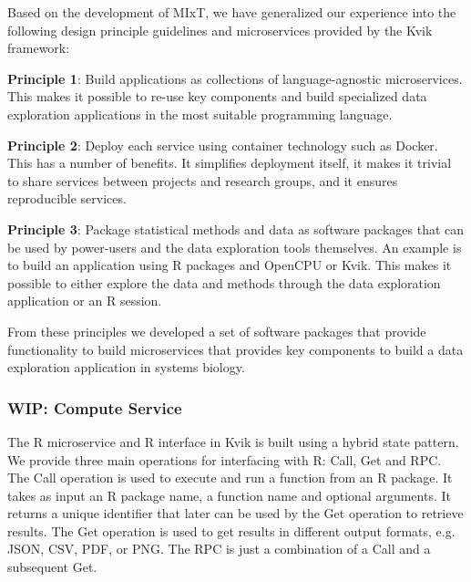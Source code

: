 Based on the development of MIxT, we have generalized our experience into the
following design principle guidelines and microservices provided by the Kvik
framework:

\textbf{Principle 1}: Build applications as collections of language-agnostic
microservices. This makes it possible to re-use key components and build
specialized data exploration applications in the most suitable programming
language. 

\textbf{Principle 2}: Deploy each service using container technology such as
Docker. This has a number of benefits. It simplifies deployment itself, it makes
it trivial to share services between projects and research groups, and it
ensures reproducible services.

\textbf{Principle 3}: Package statistical methods and data as software packages
that can be used by power-users and the data exploration tools themselves. An
example is to build an application using R packages and OpenCPU or Kvik. This
makes it possible to either explore the data and methods through the data
exploration application or an R session. 

From these principles we developed a set of software packages that provide
functionality to build microservices that provides key components to build a
data exploration application in systems biology. 


\subsubsection*{WIP: Compute Service}

The R microservice and R interface in Kvik is built using a hybrid state
pattern\cite{opencpu}. We provide three main operations for interfacing with R:
Call, Get and RPC. The Call operation is used to execute and run a function from
an R package. 
It takes as input an R package name, a function name and optional
arguments. It returns a unique identifier that later can be used by the Get
operation to retrieve results. The Get operation is used to get results in
different output formats, e.g. JSON, CSV, PDF, or PNG. The RPC is just a
combination of a Call and a subsequent Get. 

